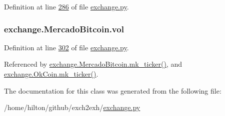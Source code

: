 Definition at line \hyperlink{exchange_8py_source_l00286}{286} of file \hyperlink{exchange_8py_source}{exchange.\+py}.

\subsubsection[{\texorpdfstring{vol}{vol}}]{\setlength{\rightskip}{0pt plus 5cm}exchange.\+Mercado\+Bitcoin.\+vol}\hypertarget{classexchange_1_1_mercado_bitcoin_a1c163489086ba85b960db821117cd433}{}\label{classexchange_1_1_mercado_bitcoin_a1c163489086ba85b960db821117cd433}


Definition at line \hyperlink{exchange_8py_source_l00302}{302} of file \hyperlink{exchange_8py_source}{exchange.\+py}.



Referenced by \hyperlink{exchange_8py_source_l00320}{exchange.\+Mercado\+Bitcoin.\+mk\+\_\+ticker()}, and \hyperlink{exchange_8py_source_l00385}{exchange.\+Ok\+Coin.\+mk\+\_\+ticker()}.



The documentation for this class was generated from the following file\+:\begin{DoxyCompactItemize}
\item 
/home/hilton/github/exch2exh/\hyperlink{exchange_8py}{exchange.\+py}\end{DoxyCompactItemize}
